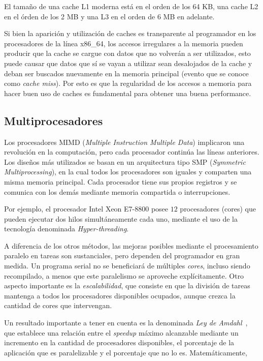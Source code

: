 El tama\~no de una cache L1 moderna est\'a en el orden de los 64 KB, una cache L2 en el \'orden de los 2 MB y una L3 en el orden de 6 MB en adelante.

Si bien la aparici\'on y utilizaci\'on de caches es transparente al programador en los procesadores de la l\'inea x86\_64, los accesos irregulares a la memoria pueden producir que la cache se cargue con datos que no volver\'an a ser utilizados, esto puede causar que datos que s\'i se vayan a utilizar sean desalojados de la cache y deban ser buscados nuevamente en la memoria principal (evento que se conoce como \textit{cache miss}). 
Por esto es que la regularidad de los accesos a memoria para hacer buen uso de caches es fundamental para obtener una buena performance.

\subsection{Multiprocesadores}

Los procesadores MIMD (\textit{Multiple Instruction Multiple Data}) implicaron una revoluci\'on en la computaci\'on, pero cada procesador contin\'ua las l\'ineas anteriores.
Los dise\~nos m\'as utilizados se basan en un arquitectura tipo SMP (\textit{Symmetric Multiprocessing}), en la cual todos los procesadores son iguales y comparten una misma memoria principal. 
Cada procesador tiene sus propios registros y se comunica con los dem\'as mediante memoria compartida o interrupciones.

Por ejemplo, el procesador Intel Xeon E7-8800 posee $12$ procesadores (cores) que pueden ejecutar dos hilos simult\'aneamente cada uno, mediante el uso de la tecnolog\'ia denominada \textit{Hyper-threading}.

A diferencia de los otros m\'etodos, las mejoras posibles mediante el procesamiento paralelo en tareas son sustanciales, pero dependen del programador en gran medida. 
Un programa serial no se beneficiar\'a de m\'ultiples \textit{cores}, incluso siendo recompilado, a menos que este paralelismo se aproveche expl\'icitamente. 
Otro aspecto importante es la \textit{escalabilidad}, que consiste en que la divisi\'on de tareas mantenga a todos los procesadores disponibles ocupados, aunque crezca la cantidad de cores que intervengan.

Un resultado importante a tener en cuenta es la denominada \textit{Ley de Amdahl}~\cite{Amdahl1967}, que establece una relaci\'on entre el \textit{speedup} m\'aximo alcanzable mediante un incremento en la cantidad de procesadores disponibles, el porcentaje
de la aplicaci\'on que es paralelizable y el porcentaje que no lo es. Matem\'aticamente,

